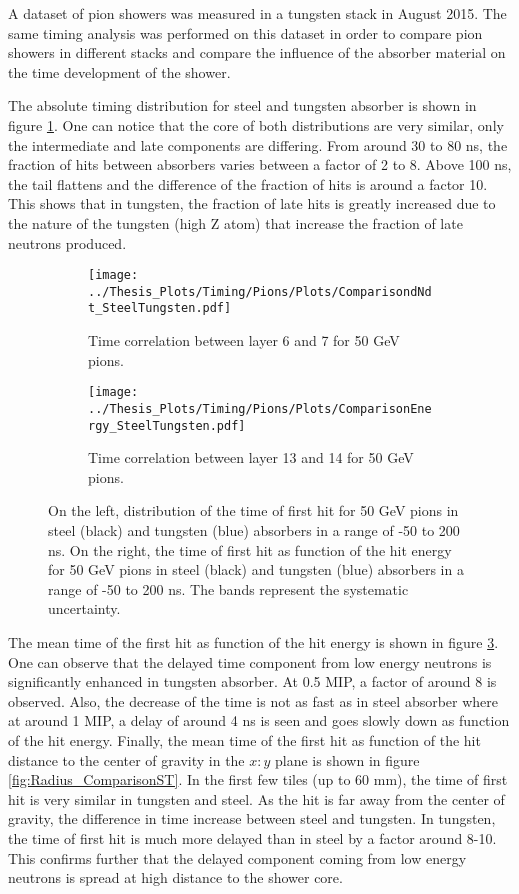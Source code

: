 A dataset of pion showers was measured in a tungsten stack in August 2015. The same timing analysis was performed on this dataset \cite{ChristianTungsten} in order to compare pion showers in different stacks and compare the influence of the absorber material on the time development of the shower.

The absolute timing distribution for steel and tungsten absorber is shown in figure \ref{fig:dNdt_ComparisonST}. One can notice that the core of both distributions are very similar, only the intermediate and late components are differing. From around 30 to 80 ns, the fraction of hits between absorbers varies between a factor of 2 to 8. Above 100 ns, the tail flattens and the difference of the fraction of hits is around a factor 10. This shows that in tungsten, the fraction of late hits is greatly increased due to the nature of the tungsten (high Z atom) that increase the fraction of late neutrons produced.

\begin{figure}[htbp!]
	\begin{subfigure}[t]{0.5\textwidth}
		\centering
		\texttt{[image: ../Thesis\_Plots/Timing/Pions/Plots/ComparisondNdt\_SteelTungsten.pdf]}
		\caption{Time correlation between layer 6 and 7 for 50 GeV pions.} \label{fig:dNdt_ComparisonST}
	\end{subfigure}
	\hfill
	\begin{subfigure}[t]{0.5\textwidth}
		\centering
		\texttt{[image: ../Thesis\_Plots/Timing/Pions/Plots/ComparisonEnergy\_SteelTungsten.pdf]}
		\caption{Time correlation between layer 13 and 14 for 50 GeV pions.}\label{fig:Energy_ComparisonST}
	\end{subfigure}
	\caption{On the left, distribution of the time of first hit for 50 GeV pions in steel (black) and tungsten (blue) absorbers in a range of -50 to 200 ns. On the right, the time of first hit as function of the hit energy for 50 GeV pions in steel (black) and tungsten (blue) absorbers in a range of -50 to 200 ns. The bands represent the systematic uncertainty.}
\end{figure}

The mean time of the first hit as function of the hit energy is shown in figure \ref{fig:Energy_ComparisonST}. One can observe that the delayed time component from low energy neutrons is significantly enhanced in tungsten absorber. At 0.5 MIP, a factor of around 8 is observed. Also, the decrease of the time is not as fast as in steel absorber where at around 1 MIP, a delay of around 4 ns is seen and goes slowly down as function of the hit energy. Finally, the mean time of the first hit as function of the hit distance to the center of gravity in the $x:y$ plane is shown in figure \ref{fig:Radius_ComparisonST}. In the first few tiles (up to 60 mm), the time of first hit is very similar in tungsten and steel. As the hit is far away from the center of gravity, the difference in time increase between steel and tungsten. In tungsten, the time of first hit is much more delayed than in steel by a factor around 8-10. This confirms further that the delayed component coming from low energy neutrons is spread at high distance to the shower core.


